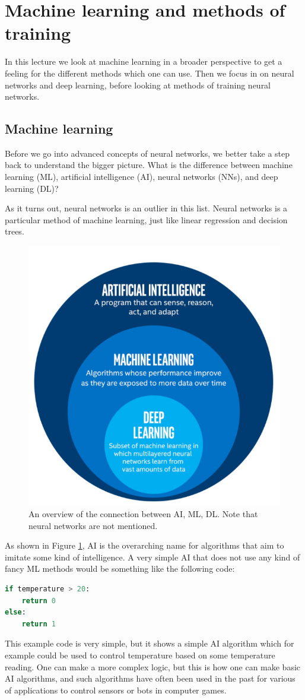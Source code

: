 \documentclass[12pt,a4paper]{article} %
\numberwithin{equation}{section}
\begin{document}
		
\section{Machine learning and methods of training}
	In this lecture we look at machine learning in a broader perspective to get a feeling for the different methods which one can use. Then we focus in on neural networks and deep learning, before looking at methods of training neural networks.
	
	\subsection{Machine learning}
		Before we go into advanced concepts of neural networks, we better take a step back to understand the bigger picture. What is the difference between machine learning (ML), artificial intelligence (AI), neural networks (NNs), and deep learning (DL)?
		
		As it turns out, neural networks is an outlier in this list. Neural networks is a particular method of machine learning, just like linear regression and decision trees. 
		\begin{figure}
			\centering
			\includegraphics[width=0.7\linewidth]{figs/ai}
			\caption{An overview of the connection between AI, ML, DL. Note that neural networks are not mentioned.}
			\label{fig:ai}
		\end{figure}
		
		As shown in Figure \ref{fig:ai}, AI is the overarching name for algorithms that aim to imitate some kind of intelligence. A very simple AI that does not use any kind of fancy ML methods would be something like the following code:
		\begin{lstlisting}[language=Python]
if temperature > 20: 
	return 0
else:
	return 1
		\end{lstlisting}
		This example code is very simple, but it shows a simple AI algorithm which for example could be used to control temperature based on some temperature reading. One can make a more complex logic, but this is how one can make basic AI algorithms, and such algorithms have often been used in the past for various of applications to control sensors or bots in computer games.
		
\end{document}
